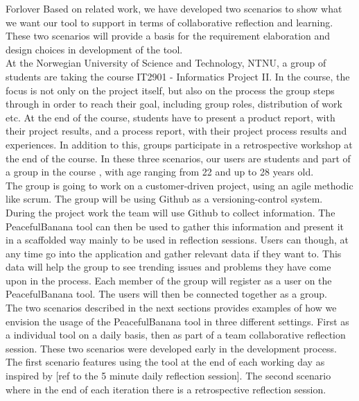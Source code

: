 Forlover
Based on related work, we have developed two scenarios to show what we want our tool to support in terms of collaborative reflection and learning. These two scenarios will provide a basis for the requirement elaboration and design choices in development of the tool. 
\\
At the Norwegian University of Science and Technology, NTNU, a group of students are taking the course IT2901 - Informatics Project II\footnotemark.
In the course, the focus is not only on the project itself, but also on the process the group steps through in order to reach their goal, including group roles, distribution of work etc. At the end of the course, students have to present a product report, with their project results, and a process report, with their project process results and experiences. In addition to this, groups participate in a retrospective workshop at the end of the course. In these three scenarios, our users are students and part of a group in the course , with age ranging from 22 and up to 28 years old.
\\
The group is going to work on a customer-driven project, using an agile methodic like scrum. The group will be using Github as a versioning-control system. During the project work the team will use Github to collect information. The PeacefulBanana tool can then be used to gather this information and present it in a scaffolded way mainly to be used in reflection sessions. Users can though, at any time go into the application and gather relevant data if they want to. This data will help the group to see trending issues and problems they have come upon in the process. Each member of the group will register as a user on the PeacefulBanana tool. The users will then be connected together as a group. 
\\
The two scenarios described in the next sections provides examples of how we envision the usage of the PeacefulBanana tool in three different settings. First as a individual tool on a daily basis, then as part of a team collaborative reflection session.
These two scenarios were developed early in the development process. The first scenario features using the tool at the end of each working day as inspired by [ref to the 5 minute daily reflection session]. The second scenario where in the end of each iteration there is a retrospective reflection session. 
\\


